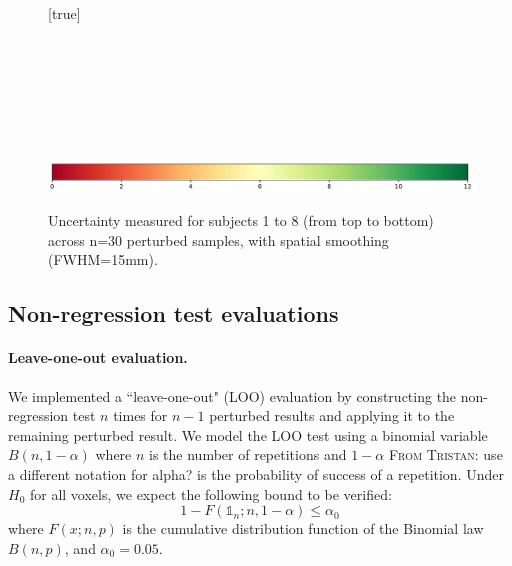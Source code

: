 \documentclass{article}
\newcommand{\TG}[1]{\color{blue}\textsc{From Tristan:} #1\color{black}\xspace}
\begin{document}
\begin{landscape}
    \begin{figure}
        \vspace*{-2cm}
        \centering
        [true] \\
         \\
         \\
         \\
         \\
         \\
         \\
         \\
        \includegraphics*[width=.7\linewidth]{figures/colorbar_sigbit.pdf}
        \caption{Uncertainty measured for subjects 1 to 8 (from top to bottom) across n=30 perturbed samples, with spatial smoothing (FWHM=15mm).}
        \label{fig:uncertainty-maps}

    \end{figure}
\end{landscape}

\subsection{Non-regression test evaluations}

\paragraph{Leave-one-out evaluation.} We implemented a ``leave-one-out" (LOO) evaluation by constructing the non-regression test $n$ times for $n-1$ perturbed results and applying it to the remaining perturbed result.
We model the LOO test using a binomial variable $B(n,1-\alpha)$ where $n$ is the number of repetitions and $1-\alpha$ \TG{use a different notation for alpha?} is the probability of success of a repetition. Under $H_0$ for all voxels, we expect the following bound to be verified:
\[
    1-F(\mathds{1}_n;n,1-\alpha) \leq \alpha_0
\]
where $F(x;n,p)$ is the cumulative distribution function of the Binomial law $B(n,p)$, and $\alpha_0=0.05$.
\end{document}
